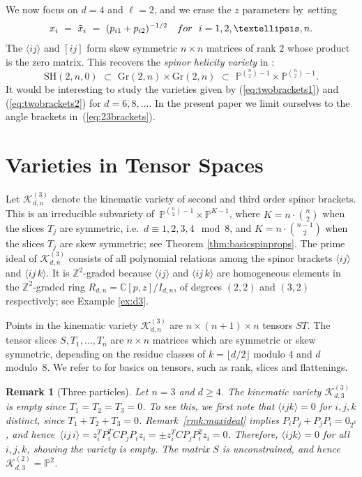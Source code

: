 \documentclass[english]{ourlematema}
\numberwithin{theorem}{section}
\newtheorem{remark}[theorem]{Remark}
\theoremstyle{definition}
\newcommand{\PP}{\mathbb{P}}
\newcommand{\CC}{\mathbb{C}}
\newcommand{\ZZ}{\mathbb{Z}}
\begin{document}
We now focus on $d=4$ and $\ell=2$, and
we erase the $z$ parameters by~setting
 \begin{align}
x_i \,\,=\,\, \tilde{x}_i \,\, = \,\, (p_{i1}+p_{i2})^{-1/2} \quad
{\rm for} \,\,\,\,i=1,2,\ldots,n.
 \end{align} 
 The $\langle ij \rangle$ and $[ij]$
form skew symmetric $n \times n$ matrices
of rank $2$ whose product is the zero matrix.
This recovers the  {\em spinor helicity variety} in \cite[Example~1.1]{EPS}:
$$ \mathrm{SH}(2,n,0)\,\,\subset \,\,\mathrm{Gr}(2,n)\times \mathrm{Gr}(2,n) \,\,\subset\,\,
\mathbb{P}^{\binom{n}{2}-1}\times\mathbb{P}^{\binom{n}{2}-1}.$$
It would be interesting to 
study the varieties given by 
 (\ref{eq:twobrackets1}) and (\ref{eq:twobrackets2}) for 
 $d=6,8,\ldots$.
In the present paper we limit ourselves to the
angle brackets in~(\ref{eq:23brackets}).
\section{Varieties in Tensor Spaces}
\label{sec6}

Let $\mathcal{K}^{(3)}_{d,n}$ denote the kinematic variety of second  and third order spinor brackets.
This is an irreducible subvariety of
$\,\PP^{\binom{n}{2} - 1} \times \PP^{K -1}$,
where $K = n \cdot \binom{n}{2}$ when the slices $T_j$ are symmetric, i.e.\ $d \equiv 1,2,3,4 \!\! \mod{8}$, and 
$K = n \cdot\binom{n - 1}{2}$ when the slices $T_j$ are skew symmetric;
see Theorem \ref{thm:basicspinprops}.
The prime ideal of $\mathcal{K}^{(3)}_{d,n}$  consists of all
polynomial relations among the spinor brackets $\langle i j \rangle$ and $\langle i j \,k \rangle$. 
It is $\ZZ^2$-graded because 
$\langle i j \rangle$ and $\langle i j\, k \rangle$ are homogeneous
elements in the $\ZZ^2$-graded ring $R_{d,n} = \CC[p,z]/I_{d,n}$, of degrees 
$(2,2)$ and $(3,2)$ respectively; see Example  \ref{ex:d3}.

Points in the kinematic variety  $\mathcal{K}^{(3)}_{d,n}$ are
  $n \times (n + 1)\times n $ tensors $ST$. 
 The tensor slices $S,T_1,\ldots,T_n$ 
 are $n \times n$ matrices
 which are symmetric or skew symmetric, depending
 on the residue classes of $k = \lfloor d/2 \rfloor$ 
 modulo $4$ and $d$ modulo~$8$.
 We refer to \cite{JML, MS}
 for basics on tensors,  such as
 rank, slices and flattenings.
 
 \begin{remark}[Three particles]
 Let $n=3$ and $d \geq 4$. 
  The kinematic variety $\mathcal{K}^{(3)}_{d,3}$ is
 empty since $T_1=T_2=T_3 = 0$. To see this,
 we first note that  $\langle ijk \rangle =0$
 for $i,j,k$ distinct, since $T_1 + T_2 + T_3 = 0$. Remark~\ref{rmk:maxideal} implies 
 $P_iP_j + P_j P_i = 0_{2^k}$, and hence
$\,\langle ij \,i \rangle = z_i^T P_i^TCP_jP_iz_i = \pm z_i^TCP_jP_i^2z_i = 0$.
Therefore, $\langle ijk \rangle =0$ for all $i,j,k$, showing the variety is empty.
The matrix $S$ is unconstrained, and hence
$ \mathcal{K}^{(2)}_{d,3} = \PP^2$.
 \end{remark}
 
\end{document}
